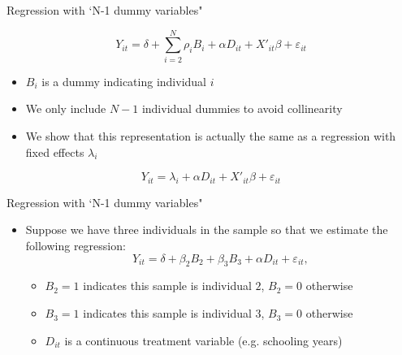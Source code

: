 \documentclass[dvipsnames,hyperref={pdfpagelabels=false}]{beamer}
\begin{document}
\begin{frame}{Regression with `N-1 dummy variables"}

\begin{equation*}
	Y_{it}=\delta + \sum^{N}_{i=2} \rho_{i} B_{i}+  \alpha D_{it}+X'_{it}\beta+\varepsilon_{it}
\end{equation*}

	\begin{itemize} 		
		

			\item $B_{i}$ is a dummy indicating individual $i$
			\vspace{0.2cm}
			\item We only include $N-1$ individual dummies to avoid collinearity
		\vspace{0.2cm}
		\item We show that this representation is actually the same as a regression with fixed effects $\lambda_i$
	\end{itemize}

		\begin{equation*}
	Y_{it}=\lambda_i+\alpha D_{it}+X'_{it}\beta + \varepsilon_{it}
\end{equation*}

\end{frame}








\begin{frame}{Regression with `N-1 dummy variables"}
	\begin{itemize} 
		\item Suppose we have three individuals in the sample so that we estimate the following regression:
		\begin{equation*}
			Y_{it}=\delta + \beta_{2} B_{2} + \beta_{3} B_{3} + \alpha D_{it}+\varepsilon_{it},
		\end{equation*}
		\begin{itemize} 
			\item $B_{2}=1$ indicates this sample is individual $2$, $B_{2}=0$ otherwise
			\vspace{0.2cm}
			\item $B_{3}=1$ indicates this sample is individual $3$, $B_{3}=0$ otherwise
			\vspace{0.2cm}
			\item $D_{it}$ is a continuous treatment variable (e.g. schooling years)
			
			
		\end{itemize}
		
	\end{itemize}
\end{frame}
\end{document}
